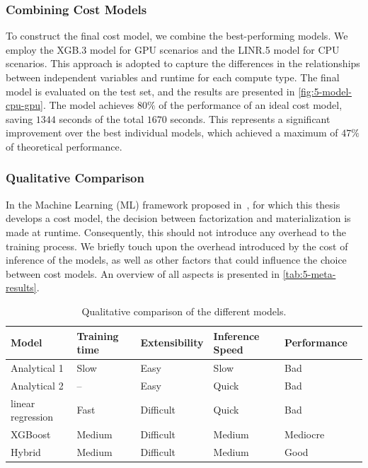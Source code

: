 \subsubsection{Combining Cost Models}
\label{subsec:5-hybrid}
To construct the final cost model, we combine the best-performing models. We employ the XGB.3 model for GPU scenarios and the LINR.5 model for CPU scenarios. This approach is adopted to capture the differences in the relationships between independent variables and runtime for each compute type. The final model is evaluated on the test set, and the results are presented in \autoref{fig:5-model-cpu-gpu}. The model achieves $80\%$ of the performance of an ideal cost model, saving $1344$ seconds of the total $1670$ seconds. This represents a significant improvement over the best individual models, which achieved a maximum of $47\%$ of theoretical performance.

\subsubsection{Qualitative Comparison}
In the Machine Learning (ML) framework proposed in~\cite{amalur}, for which this thesis develops a cost model, the decision between factorization and materialization is made at runtime. Consequently, this should not introduce any overhead to the training process. We briefly touch upon the overhead introduced by the cost of inference of the models, as well as other factors that could influence the choice between cost models. An overview of all aspects is presented in \autoref{tab:5-meta-results}.

\begin{table}[ht]
  \centering
  \begin{tabular}{llllll}
    \toprule
    Model             & Training time & Extensibility & Inference Speed & Performance \\
    \midrule
    Analytical 1      & Slow          & Easy          & Slow            & Bad         \\
    Analytical 2      & --            & Easy          & Quick           & Bad         \\
    linear regression & Fast          & Difficult     & Quick           & Bad         \\
    XGBoost           & Medium        & Difficult     & Medium          & Mediocre    \\
    Hybrid            & Medium        & Difficult     & Medium          & Good        \\
    \bottomrule
  \end{tabular}
  \caption{Qualitative comparison of the different models.}
  \label{tab:5-meta-results}
\end{table}



